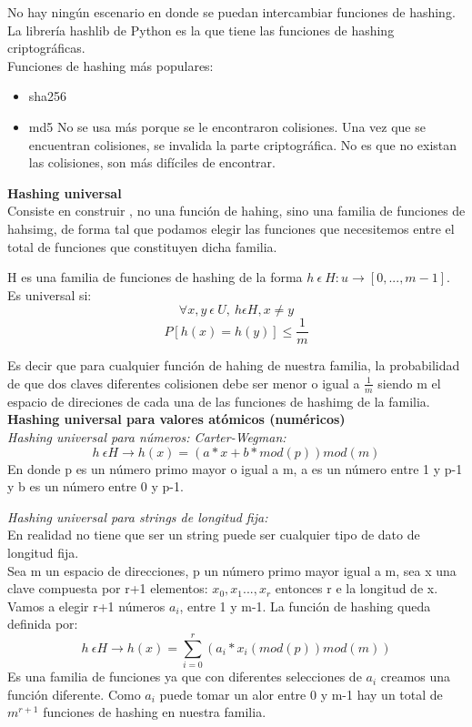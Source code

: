 \documentclass[titlepage,a4paper]{article}
\begin{document}
No hay ningún escenario en donde se puedan intercambiar funciones de hashing. \\

La librería hashlib de Python es la que tiene las funciones de hashing criptográficas. \\

Funciones de hashing más populares: 
\begin{itemize}
\item sha256
\item md5 No se usa más porque se le encontraron colisiones. Una vez que se encuentran colisiones, se invalida la parte criptográfica. No es que no existan las colisiones, son más difíciles de encontrar. \\
\end{itemize}

\textbf{Hashing universal} \\

Consiste en construir , no una función de hahing, sino una familia de funciones de hahsimg, de forma tal que podamos elegir las funciones que necesitemos entre el total de funciones que constituyen dicha familia. 

H es una familia de funciones de hashing de la forma $h\ \epsilon\ H: u\rightarrow [0,..., m-1]$. Es universal si: $$\forall x, y\ \epsilon\ U, \ h \epsilon H, x \neq y $$ $$ P[h(x) = h(y)] \leq \frac{1}{m} $$

Es decir que para cualquier función de hahing de nuestra familia, la probabilidad de que dos claves diferentes colisionen debe ser menor o igual a $\frac{1}{m}$ siendo m el espacio de direciones de cada una de las funciones de hashimg de la familia. \\

\textbf{Hashing universal para valores atómicos (numéricos)}\\



\textit{Hashing universal para números: Carter-Wegman:} $$h\ \epsilon H \rightarrow h(x) = (a*x+b*mod(p)) mod(m)$$
En donde p es un número primo mayor o igual a m, a es un número entre 1 y p-1 y b es un número entre 0 y p-1. 

\textit{Hashing universal para strings de longitud fija:  }\\

En realidad no tiene que ser un string puede ser cualquier tipo de dato de longitud fija.   \\

Sea m un espacio de direcciones, p un número primo mayor igual a m, sea x una clave compuesta por r+1 elementos: $x_0, x_1 ..., x_r$ entonces r e la longitud de x.  Vamos a elegir r+1 números $a_i$, entre 1 y m-1. La función de hashing queda definida por:
 $$ h\ \epsilon H \rightarrow h(x) = \sum_{i=0}^{r} (a_i * x_i (mod(p)) mod(m)) $$ 
 Es una familia de funciones ya que con diferentes selecciones de $a_i$ creamos una función diferente. Como $a_i$ puede tomar un alor entre 0 y m-1 hay un total de $m^{r+1}$ funciones de hashing en nuestra familia. 
 
\end{document}

